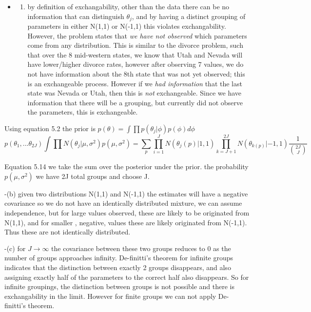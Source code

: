 \documentclass[
]{book}
\providecommand{\tightlist}{%
  \setlength{\itemsep}{0pt}\setlength{\parskip}{0pt}}
\theoremstyle{definition}
\theoremstyle{definition}
\theoremstyle{definition}
\theoremstyle{definition}
\theoremstyle{remark}
\begin{document}
\begin{itemize}
\item
  \begin{enumerate}
  \def\labelenumi{(\alph{enumi})}
  \tightlist
  \item
    by definition of exchangability, other than the data there can be no information that can distinguish \(\theta_j\), and by having a distinct grouping of parameters in either N(1,1) or N(-1,1) this violates exchangability. However, the problem states that \emph{we have not observed} which parameters come from any distribution. This is similar to the divorce problem, such that over the 8 mid-western states, we know that Utah and Nevada will have lower/higher divorce rates, however after observing 7 values, we do not have information about the 8th state that was not yet observed; this is an exchangeable process. However if we \emph{had information} that the last state was Nevada or Utah, then this is \emph{not} exchangeable. Since we have information that there will be a grouping, but currently did not observe the parameters, this is exchangeable.
  \end{enumerate}
\end{itemize}

Using equation 5.2 the prior is \(p(\theta) = \int \prod p(\theta_j | \phi) p(\phi)d\phi\)
\begin{equation}
p(\theta_1,...\theta_{2J}) \int \prod N(\theta_j | \mu, \sigma^2)p(\mu, \sigma^2)= \sum_p \prod_{i=1}^J N(\theta_j(p)| 1,1)\prod_{k=J+1}^{2J}N(\theta_{k(p)}| -1,1)\frac{1}{{2J\choose J}}
\end{equation}

Equation 5.14 we take the sum over the posterior under the prior. the probability \(p(\mu,\sigma^2)\) we have 2J total groups and choose J.

-(b) given two distributions N(1,1) and N(-1,1) the estimates will have a negative covariance so we do not have an identically distributed mixture, we can assume independence, but for large values observed, these are likely to be originated from N(1,1), and for smaller , negative, values these are likely originated from N(-1,1). Thus these are not identically distributed.

-(c) for \(J\to \infty\) the covariance between these two groups reduces to 0 as the number of groups approaches infinity. De-finitti's theorem for infinite groups indicates that the distinction between exactly 2 groups disappears, and also assigning exactly half of the parameters to the correct half also disappears. So for infinite groupings, the distinction between groups is not possible and there is exchangability in the limit. However for finite groups we can not apply De-finitti's theorem.
\end{document}

